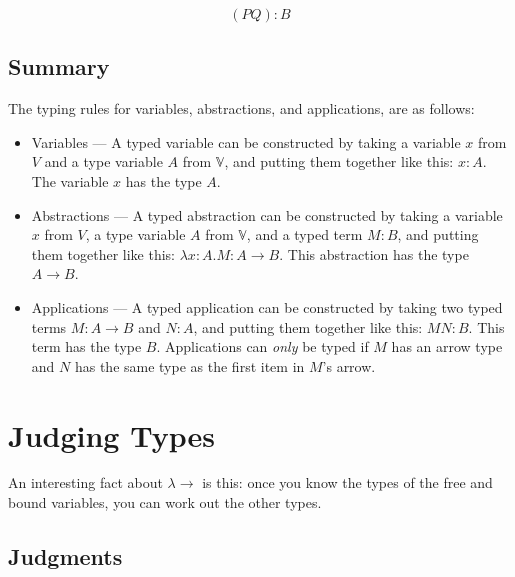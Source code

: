 \documentclass{book}
\numberwithin{equation}{chapter}
\begin{document}
\begin{equation}
(P Q) : B
\end{equation}


\section{Summary}

The typing rules for variables, abstractions, and applications, are as follows:

\begin{itemize}

\item{Variables --- A typed variable can be constructed by taking a variable $x$ from $V$ and a type variable $A$ from $\mathbb{V}$, and putting them together like this: $x : A$. The variable $x$ has the type $A$.}

\item{Abstractions --- A typed abstraction can be constructed by taking a variable $x$ from $V$, a type variable $A$ from $\mathbb{V}$, and a typed term $M : B$, and putting them together like this: $\lambda x : A.M : A \rightarrow B$. This abstraction has the type $A \rightarrow B$.}

\item{Applications --- A typed application can be constructed by taking two typed terms $M : A \rightarrow B$ and $N : A$, and putting them together like this: $MN : B$. This term has the type $B$. Applications can \textit{only} be typed if $M$ has an arrow type and $N$ has the same type as the first item in $M$'s arrow.}

\end{itemize}


\chapter{Judging Types}

An interesting fact about $\lambda\rightarrow$ is this: once you know the types of the free and bound variables, you can work out the other types.


\section{Judgments}
\end{document}
